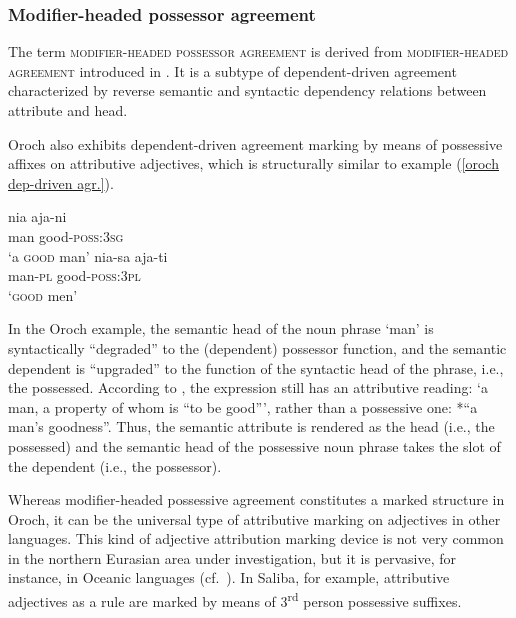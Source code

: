 \subsubsection{Modifier\hyp{}headed possessor agreement}
\label{ModheadAgr}
The term \textsc{modifier\hyp{}headed possessor agreement} is derived from \textsc{modifier\hyp{}headed agreement} introduced in \citet{AUTOTYP-NP}. It is a subtype of dependent\hyp{}driven agreement characterized by reverse semantic and syntactic dependency relations between attribute and head. 

Oroch also exhibits dependent\hyp{}driven agreement marking by means of possessive affixes on attributive adjectives, which is structurally similar to example (\ref{oroch dep-driven agr.}).

\newpage
\begin{exe}
\ex
\label{oroch mod-headed agr}
\begin{xlist}
\ex
\gll 	nia	aja-ni\\
	man	good-\textsc{poss:3sg}\\
\glt	‘a \textsc{good} man’
\ex 
\gll nia-sa aja-ti\\	
	man-\textsc{pl} good-\textsc{poss:3pl}\\
\glt	‘\textsc{good} men’
\end{xlist}
\end{exe}
In the Oroch example, the semantic head of the noun phrase ‘man’ is syntactically “degraded” to the (dependent) possessor function, and the semantic dependent is “upgraded” to the function of the syntactic head of the phrase, i.e., the possessed. According to \citet[3]{malchukov2000}, the expression still has an attributive reading: ‘a man, a property of whom is “to be good”’, rather than a possessive one: *“a man's goodness”. Thus, the semantic attribute is rendered as the head (i.e., the possessed) and the semantic head of the possessive noun phrase takes the slot of the dependent (i.e., the possessor).

Whereas modifier\hyp{}headed possessive agreement constitutes a marked structure in Oroch, it can be the universal type of attributive marking on adjectives in other languages. This kind of adjective attribution marking device is not very common in the northern Eurasian area under investigation, but it is pervasive, for instance, in Oceanic languages (cf.~\citealt{ross1998}). In Saliba, for example, attributive adjectives as a rule are marked by means of 3\textsuperscript{rd} person possessive suffixes.



